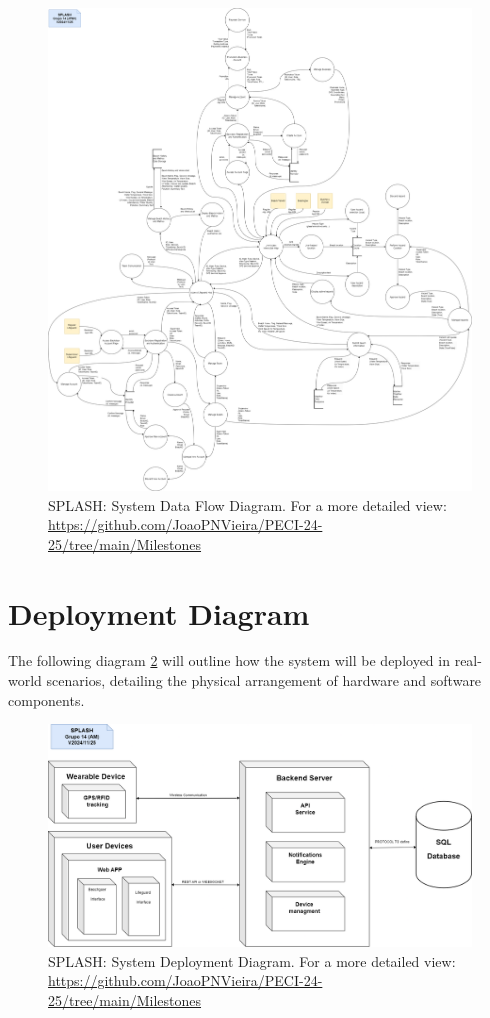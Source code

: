 \begin{figure}[H]
      \centering
      \includegraphics[width=16cm]{figs/data_flow.png}
      \caption{SPLASH: System Data Flow Diagram. For a more detailed view: \url{https://github.com/JoaoPNVieira/PECI-24-25/tree/main/Milestones}}
      \label{fig:data_flow}
\end{figure}

\newpage
\section{Deployment Diagram}
The following diagram \ref{fig:deployment} will outline how the system will be deployed in real-world scenarios, detailing the physical arrangement of hardware and software components.

\begin{figure}[H]
      \centering
      \includegraphics[width=16cm]{figs/deployment.png}
      \caption{SPLASH: System Deployment Diagram. For a more detailed view: \url{https://github.com/JoaoPNVieira/PECI-24-25/tree/main/Milestones}}
      \label{fig:deployment}
\end{figure}

